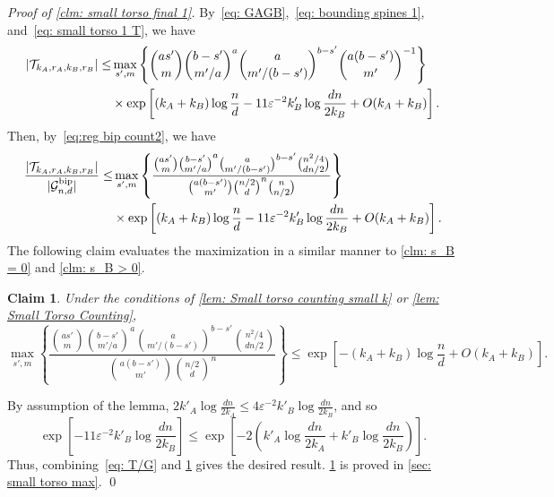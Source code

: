 \documentclass[11pt]{article}
\newcommand{\eps}{\varepsilon}
\theoremstyle{plain}
\newtheorem{claim}{Claim}[thm]
\begin{document}
    \medskip

\noindent\textit{Proof of \cref{clm: small torso final 1}.}
By~\eqref{eq: GAGB},~\eqref{eq: bounding spines 1}, and~\eqref{eq: small torso 1 T}, we have
\begin{align}
    |\mathcal T_{k_A, r_A, k_B, r_B}| \leq& \max_{s', m}\left\{ \binom{as'}{m}\binom{b - s'}{m'/a}^a\binom{a}{m'/(b - s')}^{b-s'}\binom{a(b - s')}{m'}^{-1} \right\}\notag\\
    &\times \exp\left[(k_A + k_B)\log\frac{n}{d} -11\eps^{-2}k'_B\log\frac{dn}{2k_B} + O(k_A + k_B)\right].\notag
\end{align}
Then, by~\eqref{eq:reg bip count2}, we have 
\begin{align}
    \frac{|\mathcal T_{k_A, r_A, k_B, r_B}|}{|\mathcal G_{n,d}^\text{bip}|} \leq& \max_{s', m}\left\{\frac{ \binom{as'}{m}\binom{b - s'}{m'/a}^a\binom{a}{m'/(b - s')}^{b-s'}\binom{n^2/4}{dn/2}}{\binom{a(b - s')}{m'}\binom{n/2}{d}^n\binom{n}{n/2} }\right\}\notag\\
    &\times \exp\left[(k_A + k_B)\log\frac{n}{d} -11\eps^{-2}k'_B\log\frac{dn}{2k_B} + O(k_A + k_B)\right].\label{eq: T/G}
\end{align}
The following claim evaluates the maximization in a similar manner to \cref{clm: s_B = 0} and \cref{clm: s_B > 0}.

\begin{claim}\label{clm: small torso max}
Under the conditions of \cref{lem: Small torso counting small k} or \cref{lem: Small Torso Counting},
    \[
    \max_{s', m}\left\{\frac{ \binom{as'}{m}\binom{b - s'}{m'/a}^a\binom{a}{m'/(b - s')}^{b-s'}\binom{n^2/4}{dn/2}}{\binom{a(b - s')}{m'}\binom{n/2}{d}^n }\right\} \leq \exp\left[-(k_A + k_B)\log\frac{n}{d} + O(k_A + k_B)\right].
    \]
\end{claim}
By assumption of the lemma, $2k'_A\log\frac{dn}{2k_A} \leq 4\eps^{-2}k'_B\log\frac{dn}{2k_B}$, and so 
\[
\exp\left[-11\eps^{-2}k'_B\log\frac{dn}{2k_B}\right] \leq \exp\left[-2\left(k'_A\log\frac{dn}{2k_A} + k'_B\log\frac{dn}{2k_B}\right)\right].
\]
Thus, combining~\eqref{eq: T/G} and \cref{clm: small torso max} gives the desired result. \cref{clm: small torso max} is proved in \cref{sec: small torso max}.
\qed
\end{document}
